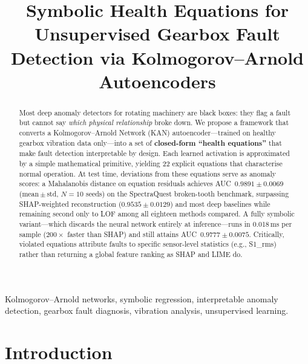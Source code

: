 \documentclass[conference]{IEEEtran}
\begin{document}
\title{Symbolic Health Equations for Unsupervised Gearbox
Fault Detection via Kolmogorov--Arnold Autoencoders}

\author{
}

\maketitle

\begin{abstract}
Most deep anomaly detectors for rotating machinery are black boxes:
they flag a fault but cannot say \emph{which physical relationship}
broke down. We propose a framework that converts a
Kolmogorov--Arnold Network (KAN) autoencoder---trained on healthy
gearbox vibration data only---into a set of \textbf{closed-form
``health equations''} that make fault detection interpretable by
design. Each learned activation is approximated by a simple
mathematical primitive, yielding 22 explicit equations that
characterise normal operation.
At test time, deviations from these equations serve as anomaly
scores: a Mahalanobis distance on equation residuals achieves
AUC~$0.9891\pm0.0069$ (mean\,$\pm$\,std, $N{=}10$ seeds) on the
SpectraQuest broken-tooth benchmark, surpassing SHAP-weighted
reconstruction ($0.9535\pm0.0129$) and most deep baselines while
remaining second only to LOF among all eighteen methods compared.
A fully symbolic variant---which discards the neural network
entirely at inference---runs in 0.018\,ms per sample
($200{\times}$ faster than SHAP) and still attains AUC~$0.9777\pm0.0075$. 
Critically, violated equations attribute faults to specific
sensor-level statistics (e.g., S1\_rms) rather than
returning a global feature ranking as SHAP and LIME do.
\end{abstract}

\begin{IEEEkeywords}
Kolmogorov--Arnold networks, symbolic regression, interpretable
anomaly detection, gearbox fault diagnosis, vibration analysis,
unsupervised learning.
\end{IEEEkeywords}

\section{Introduction}
\label{sec:intro}
\end{document}
